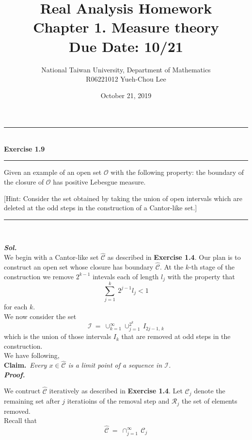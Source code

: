 \documentclass[a4paper,11pt]{article}
\title{Real Analysis Homework\\ Chapter 1. Measure theory\\ Due Date: 10/21}
\author{National Taiwan University, Department of Mathematics\\
R06221012 \hspace{0.2cm} Yueh-Chou Lee}
\date{October 21, 2019}
\begin{document}
\maketitle


\begin{flushleft}
	\rule[-0.5ex]{17cm}{2pt}\\
		\textbf{Exercise 1.9}\\
	\rule[1.5ex]{17cm}{0.5pt}
		Given an example of an open set $\mathcal{O}$ with the following property: the boundary of the closure of $\mathcal{O}$ has positive Lebesgue measure.

		[Hint: Consider the set obtained by taking the union of open intervals which are deleted at the odd steps in the construction of a Cantor-like set.]
	\rule[1.0ex]{17cm}{0.5pt}\
\end{flushleft}

\textbf{\textit{Sol.}}\\

We begin with a Cantor-like set $\hat{\mathcal{C}}$ as described in \textbf{Exercise 1.4}. Our plan is to construct an open set whose closure has boundary $\hat{\mathcal{C}}$. At the $k$-th stage of the construction we remove $2^{k - 1}$ intevals each of length $l_j$ with the property that
	$$\sum_{j = 1}^{k}\ 2^{j - 1} l_j < 1$$
for each $k$.\\

We now consider the set
	$$\mathcal{I}\ =\ \cup_{k=1}^{\infty} \cup_{j=1}^{2^k}\,I_{2j-1,\,k}$$
which is the union of those intervals $I_k$ that are removed at odd steps in the construction.\\

We have following,\\

\textbf{Claim.}\ \textit{Every $x \in \hat{\mathcal{C}}$ is a limit point of a sequence in $\mathcal{I}$.}\\

\textit{\textbf{Proof.}}

We contruct $\hat{\mathcal{C}}$ iteratively as described in \textbf{Exercise 1.4}. Let $\mathcal{C}_j$ denote the remaining set after $j$ iteratioins of the removal step and $\mathcal{R}_j$ the set of elements removed.\\

Recall that
	$$\hat{\mathcal{C}}\ =\ \cap_{j=1}^{\infty}\,\mathcal{C}_j$$
\end{document}
